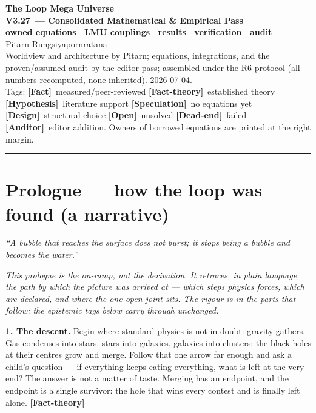 \documentclass[11pt]{article}
\newcommand{\lmuver}{3.27}
\newcommand{\Fact}{\textbf{\textcolor{green!45!black}{[Fact]}}}
\newcommand{\Hyp}{\textbf{\textcolor{blue!55!black}{[Hypothesis]}}}
\newcommand{\Spec}{\textbf{\textcolor{orange!75!black}{[Speculation]}}}
\newcommand{\Dead}{\textbf{\textcolor{red!65!black}{[Dead-end]}}}
\newcommand{\Design}{\textbf{\textcolor{purple!65!black}{[Design]}}}
\newcommand{\Open}{\textbf{\textcolor{gray!10!black}{[Open]}}}
\newcommand{\Auditor}{\textbf{\textcolor{teal!55!black}{[Auditor]}}}
\newcommand{\factth}{\textcolor{green!40!black}{\textbf{[Fact-theory]}}}
\begin{document}
\begin{center}
{\Huge\bfseries The Loop Mega Universe}\\[4pt]
{\LARGE\bfseries V\lmuver\ --- Consolidated Mathematical \& Empirical Pass}\\[3pt]
{\large\bfseries owned equations \textperiodcentered\ LMU couplings \textperiodcentered\ results \textperiodcentered\ verification \textperiodcentered\ audit}\\[8pt]
{\large Pitarn Rungsiyapornratana}\\[2pt]
{\small Worldview and architecture by Pitarn; equations, integrations, and the proven/assumed audit by the editor pass; assembled under the R6 protocol (all numbers recomputed, none inherited). 2026-07-04.}\\[2pt]
{\small Tags: \Fact\ measured/peer-reviewed \quad \factth\ established theory \quad \Hyp\ literature support \quad \Spec\ no equations yet \quad \Design\ structural choice \quad \Open\ unsolved \quad \Dead\ failed \quad \Auditor\ editor addition. Owners of borrowed equations are printed at the right margin.}
\end{center}
\hrule\vspace{6pt}
\part*{Prologue --- how the loop was found (a narrative)}
\begin{flushright}\small\emph{``A bubble that reaches the surface does not burst; it stops being a bubble and becomes the water.''}\end{flushright}

\noindent\emph{This prologue is the on-ramp, not the derivation. It retraces, in plain language, the path by which the picture was arrived at --- which steps physics forces, which are declared, and where the one open joint sits. The rigour is in the parts that follow; the epistemic tags below carry through unchanged.}

\medskip
\noindent\textbf{1. The descent.} Begin where standard physics is not in doubt: gravity gathers. Gas condenses into stars, stars into galaxies, galaxies into clusters; the black holes at their centres grow and merge. Follow that one arrow far enough and ask a child's question --- if everything keeps eating everything, what is left at the very end? The answer is not a matter of taste. Merging has an endpoint, and the endpoint is a single survivor: the hole that wins every contest and is finally left alone. \factth
\end{document}

